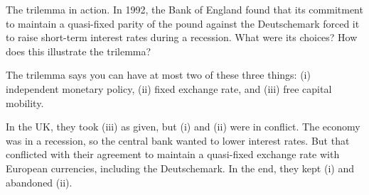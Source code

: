 \documentclass[12pt]{exam}
\begin{document}
\begin{questions}
\begin{solution}
\end{solution}

\question The trilemma in action.  In 1992, the Bank of England found
that its commitment to maintain a quasi-fixed parity of the pound against
the Deutschemark forced it to raise short-term interest rates during
a recession.
What were its choices?
How does this illustrate the trilemma?

\begin{solution}
The trilemma says you can have at most two of these three things:
(i) independent monetary policy, (ii) fixed exchange rate,
and (iii) free capital mobility.

In the UK, they took (iii) as given, but (i) and (ii) were in conflict.
The economy was in a recession, so the central bank wanted to lower
interest rates.  But that conflicted with their agreement to maintain
a quasi-fixed exchange rate with European currencies, including the
Deutschemark.
In the end, they kept (i) and abandoned (ii).
\end{solution}



\end{questions}
\end{document}
